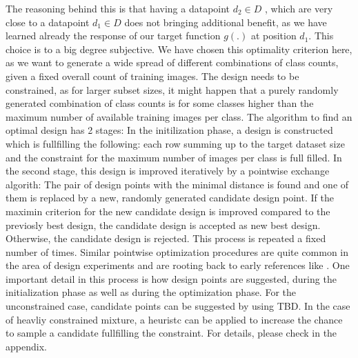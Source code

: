 \documentclass{article} %
\begin{document}
     The reasoning behind this is that having a datapoint $d_2 \in D$ , which are very close to a datapoint $d_1 \in D$ does not bringing additional benefit, as we have learned already the response of 
    our target function $g(.)$ at position $d_1$. 
     This choice is to a big degree subjective. We have chosen this optimality criterion here, as we want to generate a wide spread of different combinations of class counts, given a fixed overall count of training images.
     The design needs to be constrained, as for larger subset sizes, it might happen that a purely randomly generated combination of class counts is for some classes higher than the maximum number of available training images per class.
     The algorithm to find an optimal design has 2 stages: In the initilization phase, a design is constructed which is fullfilling the following: each row summing up to the target dataset size and the constraint for the maximum number of images per class is full filled.
     In the second stage, this design is improved iteratively by a pointwise exchange algorith: The pair of design points with the minimal distance is found and one of them is replaced by a new, randomly generated candidate design point. 
     If the maximin criterion for the new candidate design is improved compared to the previosly best design, the candidate design is accepted as new best design. 
     Otherwise, the candidate design is rejected. This process is repeated a fixed number of times. 
     Similar pointwise optimization procedures are quite common in the area of design experiments and are rooting back to early references like \cite{fedorov1972theory}.
     One important detail in this process is how design points are suggested, during the initialization phase as well as during the optimization phase.
     For the unconstrained case, candidate points can be suggested by using TBD. In the case of heavliy constrained mixture, a heuristc can be applied to increase the chance to sample a candidate fullfilling the constraint. For details, please check in the appendix.
\end{document}
